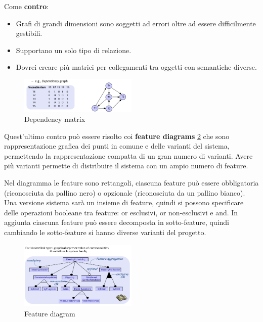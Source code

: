Come \textbf{contro}:
\begin{itemize}
      \item Grafi di grandi dimensioni sono soggetti ad errori oltre ad essere
            difficilmente gestibili.
      \item Supportano un solo tipo di relazione.
      \item Dovrei creare più matrici per collegamenti tra oggetti con semantiche
            diverse.
\end{itemize}
\begin{figure}[!ht]
      \centering
      \includegraphics[width=0.5\textwidth]{img/requirements/dependency-matrix.png}
      \caption{Dependency matrix}
      \label{fig:dependency-matrix}
\end{figure}
Quest'ultimo contro può essere risolto coi \textbf{feature diagrams}
\ref{fig:feature-diagram} che sono rappresentazione grafica dei punti in comune
e delle varianti del sistema, permettendo la rappresentazione compatta di un
gran numero di varianti. Avere più varianti permette di distribuire il sistema
con un ampio numero di feature.

Nel diagramma le feature sono rettangoli, ciascuna feature può essere obbligatoria
(riconosciuta da pallino nero) o opzionale (riconosciuta da un pallino bianco).
Una versione sistema sarà un insieme di feature, quindi si possono specificare
delle operazioni booleane tra feature: or esclusivi, or non-esclusivi e and.
In aggiunta ciascuna feature può essere decomposta in sotto-feature, quindi
cambiando le sotto-feature si hanno diverse varianti del progetto.
\begin{figure}[!ht]
      \centering
      \includegraphics[width=0.5\textwidth]{img/requirements/feature-diagrams.png}
      \caption{Feature diagram}
      \label{fig:feature-diagram}
\end{figure}